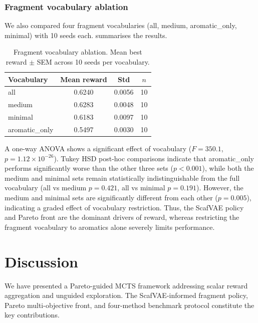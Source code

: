\documentclass[jcim,article,layout=manuscript]{achemso}
\begin{document}
\subsubsection{Fragment vocabulary ablation}

We also compared four fragment vocabularies (all, medium, aromatic\_only,
minimal) with 10 seeds each.  summarises the
results.

\begin{table}[htbp]
  \centering
  \caption{Fragment vocabulary ablation. Mean best reward $\pm$ SEM
    across 10 seeds per vocabulary.}
  \label{tab:fragment_ablation}
  \begin{tabular}{lccc}
    \toprule
    Vocabulary & Mean reward & Std & $n$ \\
    \midrule
    all & 0.6240 & 0.0056 & 10 \\
    medium & 0.6283 & 0.0048 & 10 \\
    minimal & 0.6183 & 0.0097 & 10 \\
    aromatic\_only & 0.5497 & 0.0030 & 10 \\
    \bottomrule
  \end{tabular}
\end{table}

A one-way ANOVA shows a significant effect of vocabulary ($F = 350.1$,
$p = 1.12 \times 10^{-26}$). Tukey HSD post-hoc comparisons indicate
that aromatic\_only performs significantly worse than the other three
sets ($p < 0.001$), while both the medium and minimal sets remain
statistically indistinguishable from the full vocabulary (all vs medium
$p = 0.421$, all vs minimal $p = 0.191$). However, the medium and
minimal sets are significantly different from each other ($p = 0.005$),
indicating a graded effect of vocabulary restriction. Thus, the ScafVAE
policy and Pareto front are the dominant drivers of reward, whereas
restricting the fragment vocabulary to aromatics alone severely limits
performance.

\section{Discussion}

We have presented a Pareto-guided MCTS framework addressing scalar
reward aggregation and unguided exploration. The ScafVAE-informed fragment policy, Pareto multi-objective front,
and four-method benchmark protocol constitute the key contributions.
\end{document}
